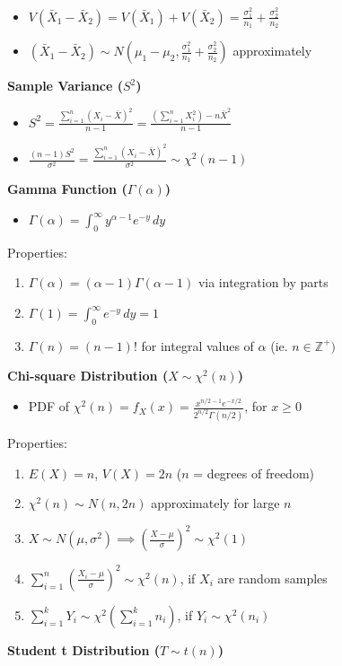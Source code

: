 \documentclass[a4paper, 12pt]{article}
\begin{document}
\begin{multicols*}{4}
\begin{itemize}
    \item $V(\bar{X}_1-\bar{X}_2) = V(\bar{X}_1)+V(\bar{X}_2) = \frac{\sigma_1^2}{n_1}+\frac{\sigma_2^2}{n_2}$
    \item $(\bar{X}_1-\bar{X}_2) \sim N(\mu_1-\mu_2, \frac{\sigma_1^2}{n_1}+\frac{\sigma_2^2}{n_2})$ approximately
\end{itemize}
\textbf{Sample Variance ($S^2$)}
\begin{itemize}
    \item $S^2 = \frac{\sum^n_{i=1}(X_i-\bar{X})^2}{n-1} = \frac{(\sum^n_{i=1}X_i^2)-n\bar{X}^2}{n-1}$
    \item $\frac{(n-1)S^2}{\sigma^2} = \frac{\sum_{i=1}^n(X_i-\bar{X})^2}{\sigma^2} \sim \chi^2(n-1)$
\end{itemize}
\textbf{Gamma Function ($\Gamma(\alpha)$)}
\begin{itemize}
    \item $\Gamma(\alpha)=\int^\infty_0 y^{\alpha-1}e^{-y} \, dy$
\end{itemize}
Properties:
\begin{enumerate}
    \item $\Gamma(\alpha)=(\alpha-1)\Gamma(\alpha-1)$ via integration by parts
    \item $\Gamma(1) = \int^\infty_0 e^{-y} \, dy = 1$
    \item $\Gamma(n) = (n-1)!$ for integral values of $\alpha$ (ie. $n \in \mathbb{Z}^+)$
\end{enumerate}
\textbf{Chi-square Distribution ($X\sim\chi^2(n)$)}
\begin{itemize}
    \item PDF of $\chi^2(n) = f_X(x) = \frac{x^{n/2-1}e^{-x/2}}{2^{n/2}\Gamma(n/2)}$, for $x\geq 0$
\end{itemize}
Properties:
\begin{enumerate}
    \item $E(X) = n$, $V(X) = 2n$ ($n$ = degrees of freedom)
    \item $\chi^2(n) \sim N(n, 2n)$ approximately for large $n$
    \item $X \sim N(\mu,\sigma^2) \implies (\frac{X-\mu}{\sigma})^2 \sim \chi^2(1)$
    \item $\sum_{i=1}^n(\frac{X_i-\mu}{\sigma})^2 \sim \chi^2(n)$, if $X_i$ are random samples
    \item $\sum_{i=1}^k Y_i \sim \chi^2(\sum_{i=1}^k n_i)$, if $Y_i \sim \chi^2(n_i)$
\end{enumerate}
\textbf{Student t Distribution ($T \sim t(n)$)}
\begin{itemize}

\end{itemize}
\end{multicols*}
\end{document}
